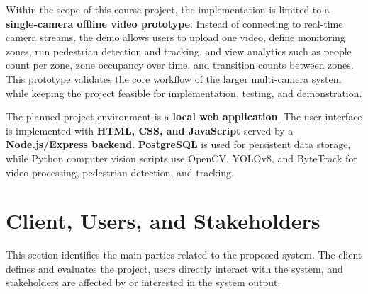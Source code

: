 \documentclass[12pt,a4paper]{report}
\begin{document}
Within the scope of this course project, the implementation is limited to a \textbf{single-camera offline video prototype}. 
Instead of connecting to real-time camera streams, the demo allows users to upload one video, define monitoring zones, run pedestrian detection and tracking, and view analytics such as people count per zone, zone occupancy over time, and transition counts between zones. 
This prototype validates the core workflow of the larger multi-camera system while keeping the project feasible for implementation, testing, and demonstration.

The planned project environment is a \textbf{local web application}. The user interface is
implemented with \textbf{HTML, CSS, and JavaScript} served by a
\textbf{Node.js/Express backend}. \textbf{PostgreSQL} is used for persistent data
storage, while Python computer vision scripts use OpenCV, YOLOv8, and ByteTrack for
video processing, pedestrian detection, and tracking.

\section{Client, Users, and Stakeholders}
\label{sec:client-users-stakeholders}

This section identifies the main parties related to the proposed system. 
The client defines and evaluates the project, users directly interact with the system, and stakeholders are affected by or interested in the system output.
\end{document}
